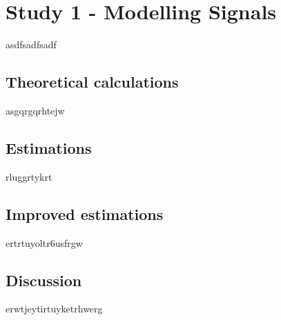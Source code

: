 \section{Study 1 - Modelling Signals}
asdfsadfsadf
\subsection{Theoretical calculations}
asgqrgqrhtejw
\subsection{Estimations}
rluggrtykrt
\subsection{Improved estimations}
ertrtuyoltr6usfrgw
\subsection{Discussion}
erwtjeytirtuyketrhwerg
